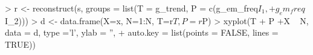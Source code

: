 \begin{CodeChunk}
\begin{CodeInput}


> r <- reconstruct(s, groups = list(T = g_trend, P = c(g_em_freq$I_1, 
+                                                      g_em_freq$I_2)))
> d <- data.frame(X=x, N=1:N, T=r$T, P=r$P)
> xyplot(T + P +X ~ N, data = d, type ='l', ylab = '',
+        auto.key = list(points = FALSE, lines = TRUE))
\end{CodeInput}

\end{CodeChunk}